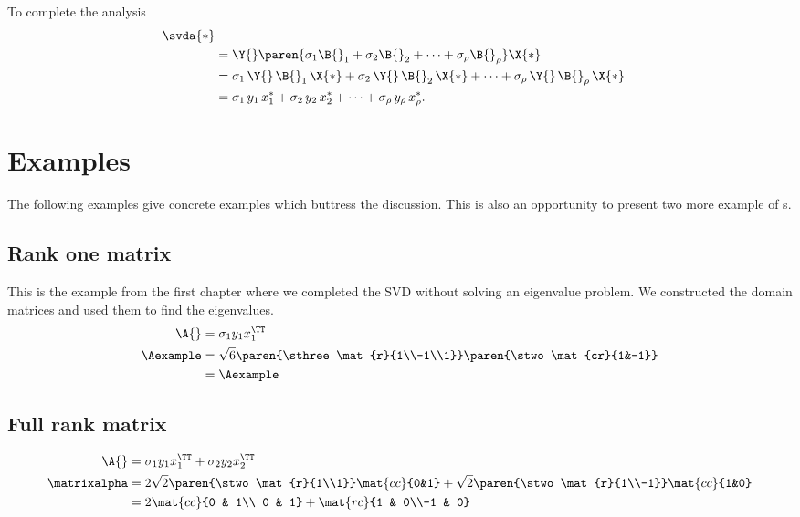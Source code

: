 To complete the analysis
\begin{equation}
  \begin{split}
    \svda{*} \\
      &= \Y{} \paren{  \sigma_{1} \B{}_{1} + \sigma_{2} \B{}_{2} + \dots + \sigma_{\rho} \B{}_{\rho} } \X{*} \\
      &= \sigma_{1}\, \Y{}\,\B{}_{1}\,\X{*} + \sigma_{2}\, \Y{}\,\B{}_{2}\,\X{*} + \dots + \sigma_{\rho}\, \Y{}\,\B{}_{\rho}\,\X{*} \\
      &= \sigma_{1}\, y_{1}\,x_{1}^{*} + \sigma_{2}\, y_{2}\,x_{2}^{*} + \dots + \sigma_{\rho}\,y_{\rho}\,x_{\rho}^{*}.
  \end{split}
\end{equation}

\section{Examples}
The following examples give concrete examples which buttress the discussion. This is also an opportunity to present two more example of \svdl s.

\subsection{Rank one matrix}
This is the example from the first chapter where we completed the SVD without solving an eigenvalue problem. We constructed the domain matrices and used them to find the eigenvalues.
\begin{equation}
  \begin{split}
   \A{} &= \sigma_{1} y_{1} x_{1}^{\TT}\\
   \Aexample &= \sqrt{6}  \paren{\sthree \mat{r}{1\\-1\\1}} \paren{\stwo \mat{cr}{1&-1}}\\
   &= \Aexample
  \end{split}
\end{equation}

\subsection{Full rank matrix}
\begin{equation}
  \begin{split}
   \A{} &= \sigma_{1} y_{1} x_{1}^{\TT} + \sigma_{2} y_{2} x_{2}^{\TT} \\
   \matrixalpha 
   &= 2\sqrt{2}  \paren{\stwo \mat{r}{1\\1}}  \mat{cc}{0&1}
    +  \sqrt{2}  \paren{\stwo \mat{r}{1\\-1}} \mat{cc}{1&0}\\
   &= 2 \mat{cc}{0 & 1\\ 0 & 1}
    +   \mat{rc}{1 & 0\\-1 & 0}\\
  \end{split}
\end{equation}

